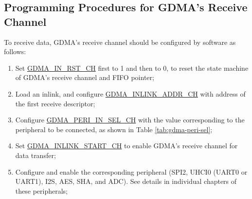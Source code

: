 \documentclass[main\_\_EN.tex]{subfiles}
\begin{document}
\subsection{Programming Procedures for GDMA's Receive Channel}
To receive data, GDMA's receive channel should be configured by software as follows:
\begin{enumerate}
    \item Set \hyperref[fielddesc:GDMAINRSTCHN]{GDMA\_IN\_RST\_CH} first to 1 and then to 0, to reset the state machine of GDMA's receive channel and FIFO pointer;
    \item Load an inlink, and configure \hyperref[fielddesc:GDMAINLINKADDRCHN]{GDMA\_INLINK\_ADDR\_CH} with address of the first receive descriptor;
    \item Configure \hyperref[fielddesc:GDMAPERIINSELCHN]{GDMA\_PERI\_IN\_SEL\_CH} with the value corresponding to the peripheral to be connected, as shown in Table \ref{tab:gdma-peri-sel};
    \item Set \hyperref[fielddesc:GDMAINLINKSTARTCHN]{GDMA\_INLINK\_START\_CH} to enable GDMA's receive channel for data transfer;
    \item Configure and enable the corresponding peripheral (SPI2, UHCI0 (UART0 or UART1), I2S, AES, SHA, and ADC). See details in individual chapters of these peripherals;
\end{enumerate} 
\end{document}

